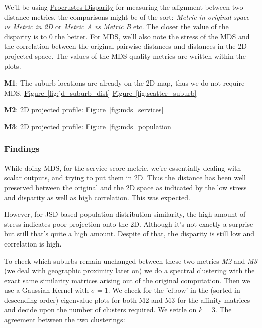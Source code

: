 \documentclass[
	a4paper, %
	10pt, %
	unnumberedsections, %
	twoside, %
]{LTJournalArticle}
\begin{document}
We'll be using \href{https://en.wikipedia.org/wiki/Procrustes_analysis}{Procrustes Disparity} for measuring the alignment between two distance metrics, the comparisons might be of the sort: \textit{Metric in original space vs Metric in 2D} or \textit{Metric A vs Metric B} etc. The closer the value of the disparity is to 0 the better. For MDS, we'll also note the \href{https://imaging.mrc-cbu.cam.ac.uk/statswiki/FAQ/mds/stress#:~:text=The%20measure%20of%20goodness%20of,or%20more%20estimated%20stimuli%20dimensions}{stress of the MDS} and the correlation between the original pairwise distances and distances in the 2D projected space. The values of the MDS quality metrics are written within the plots.

\textbf{M1}: The suburb locations are already on the 2D map, thus we do not require MDS.  \hyperref[sub@fig:jd_suburb_dist]{Figure~\ref{fig:jd_suburb_dist}} \hyperref[sub@fig:scatter_suburb]{Figure~\ref{fig:scatter_suburb}}

\textbf{M2}: 2D projected profile: \hyperref[sub@fig:mds_services]{Figure~\ref{fig:mds_services}}

\textbf{M3}: 2D projected profile: \hyperref[sub@fig:mds_population]{Figure~\ref{fig:mds_population}}




\subsubsection{Findings}

While doing MDS, for the service score metric, we're essentially dealing with scalar outputs, and trying to put them in 2D. Thus the distance has been well preserved between the original and the 2D space as indicated by the low stress and disparity as well as high correlation. This was expected.

However, for JSD based population distribution similarity, the high amount of stress indicates poor projection onto the 2D. Although it's not exactly a surprise but still that's quite a high amount. Despite of that, the disparity is still low and correlation is high. 


To check which suburbs remain unchanged between these two metrics \textit{M2} and \textit{M3} (we deal with geographic proximity later on) we do a \href{https://en.wikipedia.org/wiki/Spectral_clustering}{spectral clustering} with the exact same similarity matrices arising out of the original computation. Then we use a Gaussian Kernel with $\sigma=1$. We check for the 'elbow' in the (sorted in descending order) eigenvalue plots for both M2 and M3 for the affinity matrices and decide upon the number of clusters required. We settle on $k=3$. The agreement between the two clusterings:
\end{document}
